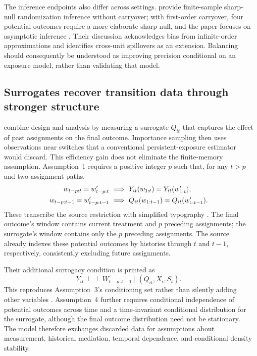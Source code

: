 The inference endpoints also differ across settings. \citet{zeng2026} provide finite-sample sharp-null randomization inference without carryover; with first-order carryover, four potential outcomes require a more elaborate sharp null, and the paper focuses on asymptotic inference \citep[Section~4.2, p.~14]{zeng2026}. Their discussion acknowledges bias from infinite-order approximations and identifies cross-unit spillovers as an extension. Balancing should consequently be understood as improving precision conditional on an exposure model, rather than validating that model.

\subsection{Surrogates recover transition data through stronger structure}

\citet{chen2026} combine design and analysis by measuring a surrogate $Q_{it}$ that captures the effect of past assignments on the final outcome. Importance sampling then uses observations near switches that a conventional persistent-exposure estimator would discard. This efficiency gain does not eliminate the finite-memory assumption. Assumption~1 requires a positive integer $p$ such that, for any $t>p$ and two assignment paths,
\begin{align}
 w_{t-p:t}=w'_{t-p:t}
 &\ \Longrightarrow\ Y_{it}(w_{1:t})=Y_{it}(w'_{1:t}),\notag\\
 w_{t-p:t-1}=w'_{t-p:t-1}
 &\ \Longrightarrow\ Q_{it}(w_{1:t-1})=Q_{it}(w'_{1:t-1}).
 \label{eq:chen-finite-carryover}
\end{align}
These transcribe the source restriction with simplified typography \citep[Assumption~1, p.~4857; PDF p.~4]{chen2026}. The final outcome's window contains current treatment and $p$ preceding assignments; the surrogate's window contains only the $p$ preceding assignments. The source already indexes these potential outcomes by histories through $t$ and $t-1$, respectively, consistently excluding future assignments.

Their additional surrogacy condition is printed as
\begin{equation}\label{eq:chen-surrogacy}
Y_{it}\perp\!\!\!\perp W_{t-p:t-1}\mid(Q_{it},X_i,S_t).
\end{equation}
This reproduces Assumption~3's conditioning set rather than silently adding other variables \citep[p.~4858]{chen2026}. Assumption~4 further requires conditional independence of potential outcomes across time and a time-invariant conditional distribution for the surrogate, although the final outcome distribution need not be stationary. The model therefore exchanges discarded data for assumptions about measurement, historical mediation, temporal dependence, and conditional density stability.

